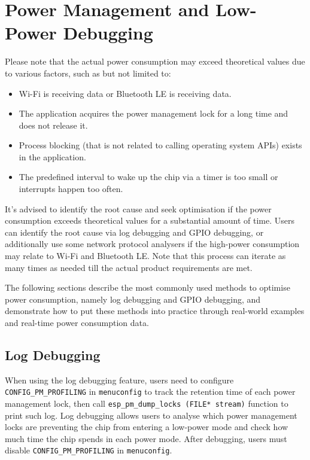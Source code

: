 \documentclass[a4paper,12pt,openany]{book}
\begin{document}
\section{Power Management and Low-Power Debugging}
Please note that the actual power consumption may exceed theoretical values due to various factors, such as but not limited to:

\begin{itemize}
    \item Wi-Fi is receiving data or Bluetooth LE is receiving data.
    \item The application acquires the power management lock for a long time and does not release it.
    \item Process blocking (that is not related to calling operating system APIs) exists in the application.
    \item The predefined interval to wake up the chip via a timer is too small or interrupts happen too often.
\end{itemize}

It’s advised to identify the root cause and seek optimisation if the power consumption exceeds theoretical values for a substantial amount of time. Users can identify the root cause via log debugging and GPIO debugging, or additionally use some network protocol analysers if the high-power consumption may relate to Wi-Fi and Bluetooth LE. Note that this process can iterate as many times as needed till the actual product requirements are met.

The following sections describe the most commonly used methods to optimise power consumption, namely log debugging and GPIO debugging, and demonstrate how to put these methods into practice through real-world examples and real-time power consumption data.

\subsection{Log Debugging}
When using the log debugging feature, users need to configure \verb|CONFIG_PM_PROFILING| in \verb|menuconfig| to track the retention time of each power management lock, then call \verb|esp_pm_dump_locks (FILE* stream)| function to print such log. Log debugging allows users to analyse which power management locks are preventing the chip from entering a low-power mode and check how much time the chip spends in each power mode. After debugging, users must disable \verb|CONFIG_PM_PROFILING| in \verb|menuconfig|.
\end{document}
